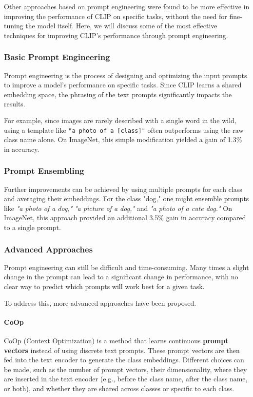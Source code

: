 Other approaches based on prompt engineering were found to be more effective in improving the performance of CLIP on specific tasks, 
without the need for fine-tuning the model itself.
Here, we will discuss some of the most effective techniques for improving CLIP's performance through prompt engineering.

\subsubsection{Basic Prompt Engineering}
Prompt engineering is the process of designing and optimizing the input prompts to improve a model's performance on specific tasks. 
Since CLIP learns a shared embedding space, the phrasing of the text prompts significantly impacts the results.

For example, since images are rarely described with a single word in the wild, using a template like \texttt{"a photo of a [class]"} 
often outperforms using the raw class name alone. On ImageNet, this simple modification yielded a gain of 1.3\% in accuracy.

\subsubsection{Prompt Ensembling}
Further improvements can be achieved by using multiple prompts for each class and averaging their embeddings. 
For the class "dog," one might ensemble prompts like \textit{"a photo of a dog,"} \textit{"a picture of a dog,"} and \textit{"a photo of a cute dog."} On ImageNet, 
this approach provided an additional 3.5\% gain in accuracy compared to a single prompt.

\subsubsection{Advanced Approaches}
Prompt engineering can still be difficult and time-consuming. Many times a slight change in the prompt can lead to a significant change in performance,
with no clear way to predict which prompts will work best for a given task.

To address this, more advanced approaches have been proposed.

\paragraph{CoOp}
CoOp (Context Optimization) is a method that learns continuous \textbf{prompt vectors} instead of using discrete text prompts.
These prompt vectors are then fed into the text encoder to generate the class embeddings.
Different choices can be made, such as the number of prompt vectors, their dimensionality, where they are inserted in the text encoder (e.g., before the class name, after the class name, or both), 
and whether they are shared across classes or specific to each class.

